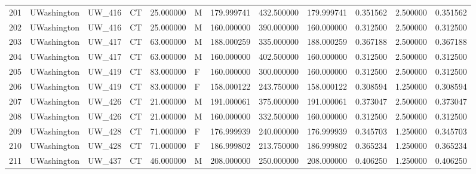 \begin{tabular}{llllrlrrrrrr}
201    &     UWashington &       UW\_416 &                 CT &  25.000000 &        M &       179.999741 &    432.500000 &  179.999741 &               0.351562 &            2.500000 &          0.351562 \\
202    &     UWashington &       UW\_416 &                 CT &  25.000000 &        M &       160.000000 &    390.000000 &  160.000000 &               0.312500 &            2.500000 &          0.312500 \\
203    &     UWashington &       UW\_417 &                 CT &  63.000000 &        M &       188.000259 &    335.000000 &  188.000259 &               0.367188 &            2.500000 &          0.367188 \\
204    &     UWashington &       UW\_417 &                 CT &  63.000000 &        M &       160.000000 &    402.500000 &  160.000000 &               0.312500 &            2.500000 &          0.312500 \\
205    &     UWashington &       UW\_419 &                 CT &  83.000000 &        F &       160.000000 &    300.000000 &  160.000000 &               0.312500 &            2.500000 &          0.312500 \\
206    &     UWashington &       UW\_419 &                 CT &  83.000000 &        F &       158.000122 &    243.750000 &  158.000122 &               0.308594 &            1.250000 &          0.308594 \\
207    &     UWashington &       UW\_426 &                 CT &  21.000000 &        M &       191.000061 &    375.000000 &  191.000061 &               0.373047 &            2.500000 &          0.373047 \\
208    &     UWashington &       UW\_426 &                 CT &  21.000000 &        M &       160.000000 &    332.500000 &  160.000000 &               0.312500 &            2.500000 &          0.312500 \\
209    &     UWashington &       UW\_428 &                 CT &  71.000000 &        F &       176.999939 &    240.000000 &  176.999939 &               0.345703 &            1.250000 &          0.345703 \\
210    &     UWashington &       UW\_428 &                 CT &  71.000000 &        F &       186.999802 &    213.750000 &  186.999802 &               0.365234 &            1.250000 &          0.365234 \\
211    &     UWashington &       UW\_437 &                 CT &  46.000000 &        M &       208.000000 &    250.000000 &  208.000000 &               0.406250 &            1.250000 &          0.406250 \\

\end{tabular}
